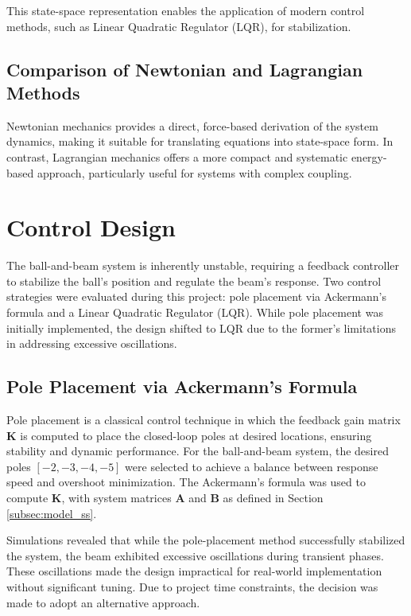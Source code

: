 \documentclass[conference]{IEEEtran}
\begin{document}
This state-space representation enables the application of modern control methods, such as Linear Quadratic Regulator (LQR), for stabilization.

\subsection{Comparison of Newtonian and Lagrangian Methods}
\label{subsec:model_comparison}
Newtonian mechanics provides a direct, force-based derivation of the system dynamics, making it suitable for translating equations into state-space form. In contrast, Lagrangian mechanics offers a more compact and systematic energy-based approach, particularly useful for systems with complex coupling.


\section{Control Design}
\label{sec:control_design}
The ball-and-beam system is inherently unstable, requiring a feedback controller to stabilize the ball's position and regulate the beam's response. Two control strategies were evaluated during this project: pole placement via Ackermann's formula and a Linear Quadratic Regulator (LQR). While pole placement was initially implemented, the design shifted to LQR due to the former's limitations in addressing excessive oscillations.

\subsection{Pole Placement via Ackermann's Formula}
\label{subsec:control_pp_v_acker}
Pole placement is a classical control technique in which the feedback gain matrix \(\mathbf{K}\) is computed to place the closed-loop poles at desired locations, ensuring stability and dynamic performance. For the ball-and-beam system, the desired poles \([-2, -3, -4, -5]\) were selected to achieve a balance between response speed and overshoot minimization. The Ackermann's formula was used to compute \(\mathbf{K}\), with system matrices \(\mathbf{A}\) and \(\mathbf{B}\) as defined in Section \ref{subsec:model_ss}.

Simulations revealed that while the pole-placement method successfully stabilized the system, the beam exhibited excessive oscillations during transient phases. These oscillations made the design impractical for real-world implementation without significant tuning. Due to project time constraints, the decision was made to adopt an alternative approach.
\end{document}
